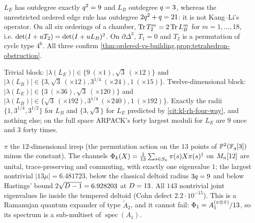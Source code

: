 \begin{numerical}
\label{num:a2-flow-operators}
$L_E$ has outdegree exactly $q^2 = 9$ and $L_B$ outdegree $q = 3$, whereas
the unrestricted ordered edge rule has outdegree $2q^2+q = 21$: it is not
Kang--Li's operator. On all six orderings of a chamber,
$\operatorname{Tr} T_2^m = 2\operatorname{Tr} L_B^m$ for $m = 1,\dots,18$, i.e.
$\det(I+u T_2) = \det(I+u L_B)^2$. On $\partial\Delta^3$, $T_1 = 0$ and %
$T_2$ is a permutation of cycle type $4^6$. All three confirm
\cref{thm:ordered-vs-building,prop:tetrahedron-obstruction}.
\end{numerical}

\begin{numerical}
\label{num:a2-block-spectra}
Trivial block: $|\lambda(L_E)|\in\{9\ (\times1),\sqrt3\ (\times12)\}$ and
$|\lambda(L_B)|\in\{3,\sqrt3\ (\times12),3^{1/4}\ (\times24),1\ (\times15)\}$.
Twelve-dimensional block: $|\lambda(L_E)|\in\{3\ (\times36),\sqrt3\
(\times120)\}$ and $|\lambda(L_B)|\in\{\sqrt3\ (\times192),3^{1/4}\
(\times240),1\ (\times192)\}$. Exactly the radii $\{1,3^{1/4},3^{1/2}\}$ for
$L_B$ and $\{3,\sqrt3\}$ for $L_E$ predicted by \cref{cit:kl-rh-four-way}, and
nothing else; on the full space ARPACK's forty largest moduli for $L_E$ are $9$
once and $3$ forty times.
\end{numerical}

\begin{numerical}
\label{num:a2-quantum-twist}
\claimstatus{num:a2-quantum-twist}{numerical}
$\pi$ the $12$-dimensional irrep (the permutation action on the $13$ points of
$\mathbb P^2(\mathbb F_q[3])$ minus the constant). The channels
$\Phi_k(X) = \frac1{13}\sum_{s\in S_k}\pi(s)X\pi(s)^\dagger$ on $M_n[12]$
are unital, trace-preserving and commuting, with exactly one eigenvalue $1$;
the largest nontrivial $|13\mu| = 6.481723$, below the classical deltoid radius %
$3q = 9$ and below Hastings' bound $2\sqrt{D-1} = 6.928203$ at $D = 13$.
All $143$ nontrivial joint eigenvalues lie inside the tempered deltoid (Cohn
defect $2.2\cdot10^{-15}$). This is a Ramanujan quantum expander of type
$\tilde A_2$, and it cannot fail: $\Phi_1 = A_1^{(\pi\otimes\bar\pi)}/13$, so
its spectrum is a sub-multiset of $\operatorname{spec}(A_1)$.
\end{numerical}

